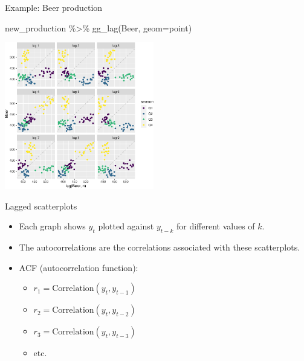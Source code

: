 \documentclass[14pt,ignorenonframetext,aspectratio=169]{beamer}
\newenvironment{Shaded}{\begin{snugshade}}{\end{snugshade}}
\newcommand{\AttributeTok}[1]{\textcolor[rgb]{0.77,0.63,0.00}{#1}}
\newcommand{\FunctionTok}[1]{\textcolor[rgb]{0.00,0.00,0.00}{#1}}
\newcommand{\NormalTok}[1]{#1}
\newcommand{\SpecialCharTok}[1]{\textcolor[rgb]{0.00,0.00,0.00}{#1}}
\newcommand{\StringTok}[1]{\textcolor[rgb]{0.31,0.60,0.02}{#1}}
\providecommand{\tightlist}{%
  \setlength{\itemsep}{0pt}\setlength{\parskip}{0pt}}
\renewenvironment{Shaded}{\color{black}\begin{snugshade}\color{black}}{\end{snugshade}}
\renewenvironment{Shaded}{\color{black}\fontsize{10}{10}\sf\begin{snugshade}\color{black}}{\end{snugshade}}
\begin{document}
\begin{frame}[fragile]{Example: Beer production}
\protect\hypertarget{example-beer-production-2}{}
\fontsize{10}{10}\sf

\begin{Shaded}
\begin{Highlighting}[]
\NormalTok{new\_production }\SpecialCharTok{\%\textgreater{}\%} \FunctionTok{gg\_lag}\NormalTok{(Beer, }\AttributeTok{geom=}\StringTok{\textquotesingle{}point\textquotesingle{}}\NormalTok{)}
\end{Highlighting}
\end{Shaded}

\includegraphics[width=6.5cm]{2-tsgraphics_files/figure-beamer/unnamed-chunk-24-1}
\end{frame}

\begin{frame}{Lagged scatterplots}
\protect\hypertarget{lagged-scatterplots}{}
\begin{itemize}
\tightlist
\item
  Each graph shows \(y_t\) plotted against \(y_{t-k}\) for different
  values of \(k\).
\item
  The autocorrelations are the correlations associated with these
  scatterplots.
\item
  ACF (autocorrelation function):

  \begin{itemize}
  \tightlist
  \item
    \(r_1=\text{Correlation}(y_{t}, y_{t-1})\)
  \item
    \(r_2=\text{Correlation}(y_{t}, y_{t-2})\)
  \item
    \(r_3=\text{Correlation}(y_{t}, y_{t-3})\)
  \item
    etc.
  \end{itemize}
\end{itemize}
\end{frame}
\end{document}
